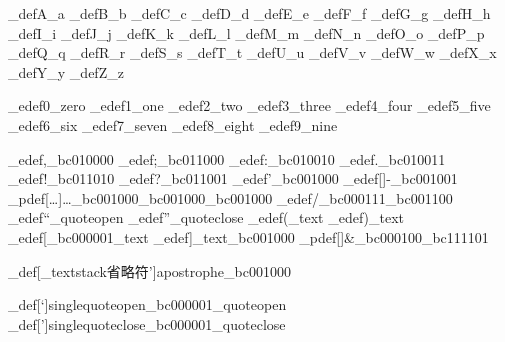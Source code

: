 \brl@char_def{A}{\brl@char@alias_a}
\brl@char_def{B}{\brl@char@alias_b}
\brl@char_def{C}{\brl@char@alias_c}
\brl@char_def{D}{\brl@char@alias_d}
\brl@char_def{E}{\brl@char@alias_e}
\brl@char_def{F}{\brl@char@alias_f}
\brl@char_def{G}{\brl@char@alias_g}
\brl@char_def{H}{\brl@char@alias_h}
\brl@char_def{I}{\brl@char@alias_i}
\brl@char_def{J}{\brl@char@alias_j}
\brl@char_def{K}{\brl@char@alias_k}
\brl@char_def{L}{\brl@char@alias_l}
\brl@char_def{M}{\brl@char@alias_m}
\brl@char_def{N}{\brl@char@alias_n}
\brl@char_def{O}{\brl@char@alias_o}
\brl@char_def{P}{\brl@char@alias_p}
\brl@char_def{Q}{\brl@char@alias_q}
\brl@char_def{R}{\brl@char@alias_r}
\brl@char_def{S}{\brl@char@alias_s}
\brl@char_def{T}{\brl@char@alias_t}
\brl@char_def{U}{\brl@char@alias_u}
\brl@char_def{V}{\brl@char@alias_v}
\brl@char_def{W}{\brl@char@alias_w}
\brl@char_def{X}{\brl@char@alias_x}
\brl@char_def{Y}{\brl@char@alias_y}
\brl@char_def{Z}{\brl@char@alias_z}


\brl@char_edef{0}{\brl@char@alias_zero}
\brl@char_edef{1}{\brl@char@alias_one}
\brl@char_edef{2}{\brl@char@alias_two}
\brl@char_edef{3}{\brl@char@alias_three}
\brl@char_edef{4}{\brl@char@alias_four}
\brl@char_edef{5}{\brl@char@alias_five}
\brl@char_edef{6}{\brl@char@alias_six}
\brl@char_edef{7}{\brl@char@alias_seven}
\brl@char_edef{8}{\brl@char@alias_eight}
\brl@char_edef{9}{\brl@char@alias_nine}


\brl@char_edef{,}{\brl@char_bc010000}
\brl@char_edef{;}{\brl@char_bc011000}
\brl@char_edef{:}{\brl@char_bc010010}
\brl@char_edef{.}{\brl@char_bc010011}
\brl@char_edef{!}{\brl@char_bc011010}
\brl@char_edef{?}{\brl@char_bc011001}
\brl@char_edef{'}{\brl@char_bc001000}
\brl@char_edef[]{-}{\brl@char_bc001001}
\brl@char_pdef[…]{\dots}{\brl@char_bc001000\brl@char_bc001000\brl@char_bc001000}
\brl@char_edef{/}{\brl@char_bc000111\brl@char_bc001100}
\brl@char_edef{“}{\brl@char@alias_quoteopen}
\brl@char_edef{”}{\brl@char@alias_quoteclose}
\brl@char_edef{(}{\brl@char@alias_text}
\brl@char_edef{)}{\brl@char@alias_text}
\brl@char_edef{[}{\brl@char_bc000001\brl@char@alias_text}
\brl@char_edef{]}{\brl@char@alias_text\brl@char_bc001000}
\brl@char_pdef[]{\&}{\brl@char_bc000100\brl@char_bc111101}


\brl@char_def[\brl@char_textstack{省略符}{'}]{apostrophe}{\brl@char_bc001000}

\brl@char_def[`]{singlequoteopen}{\brl@char_bc000001\brl@char@alias_quoteopen}
\brl@char_def[']{singlequoteclose}{\brl@char_bc000001\brl@char@alias_quoteclose}

